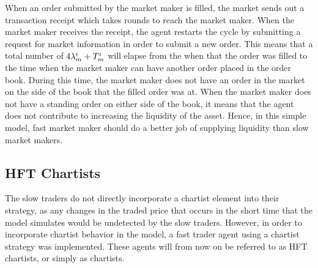 When an order submitted by the market maker is filled, the market sends out a transaction receipt which takes  rounds to reach the market maker. When the market maker receives the receipt, the agent restarts the cycle by submitting a request for market information in order to submit a new order. This means that a total number of $4\lambda_m^{i} + T_m^{i}$ will elapse from the when that the order was filled to the time when the market maker can have another order placed in the order book. During this time, the market maker does not have an order in the market on the side of the book that the filled order was at. When the market maker does not have a standing order on either side of the book, it means that the agent does not contribute to increasing the liquidity of the asset. Hence, in this simple model, fast market maker should do a better job of supplying liquidity than slow market makers.






\subsection{HFT Chartists}\label{section:hft_chartist}
The slow traders do not directly incorporate a chartist element into their strategy, as any changes in the traded price that occurs in the short time that the model simulates would be undetected by the slow traders. However, in order to incorporate chartist behavior in the model, a fast trader agent using a chartist strategy was implemented. These agents will from now on be referred to as HFT chartists, or simply as chartists. 
